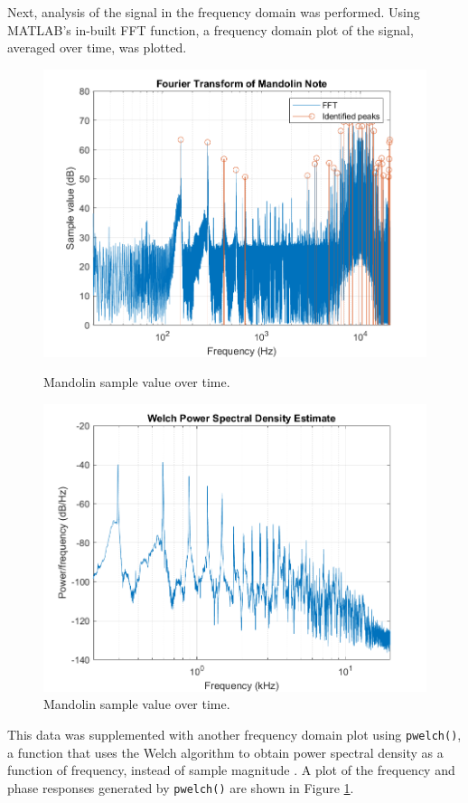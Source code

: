 \documentclass{article}
\begin{document}
            Next, analysis of the signal in the frequency domain was performed.
            Using MATLAB's in-built FFT function, a frequency domain plot of the signal, averaged over time, was plotted.
            \begin{figure}[H]
                \centering
                \begin{minipage}{.49\textwidth}
                    \includegraphics[width=\linewidth]{images/FFTMando.png}%
                    \centering
                    \caption{Mandolin sample value over time.}
                    \label{FFTMando}
                \end{minipage}
                \begin{minipage}{.49\textwidth}
                    \includegraphics[width=\linewidth]{images/welchMando.png}%
                    \centering
                    \caption{Mandolin sample value over time.}
                    \label{welchMando}
                \end{minipage}
            \end{figure}
            This data was supplemented with another frequency domain plot using \texttt{pwelch()}, a function that uses the Welch algorithm to obtain power spectral density as a function of frequency, instead of sample magnitude \cite{solomon1991psd}.
            A plot of the frequency and phase responses generated by \texttt{pwelch()} are shown in Figure \ref{welchMando}.
\end{document}
